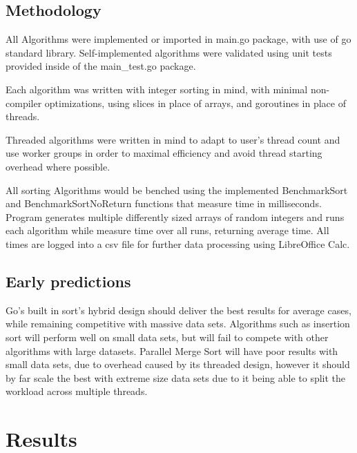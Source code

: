 \documentclass[11pt,a4paper]{article}
\begin{document}
\subsection{Methodology}

All Algorithms were implemented or imported in main.go package, with use of go standard library.
Self-implemented algorithms were validated using unit tests provided inside of
the main\_test.go package.

Each algorithm was written with integer sorting in mind, with minimal
non-compiler optimizations, using slices in place of arrays, and goroutines in
place of threads.

Threaded algorithms were written in mind to adapt to user's thread count and
use worker groups in order to maximal efficiency and avoid thread starting
overhead where possible.

All sorting Algorithms would be benched using the implemented BenchmarkSort and
BenchmarkSortNoReturn functions that measure time in milliseconds. Program
generates multiple differently sized arrays of random integers and runs each
algorithm while measure time over all runs, returning average time. All times
are logged into a csv file for further data processing using LibreOffice Calc.

\subsection{Early predictions}
Go's built in sort's hybrid design should deliver the best results for average
cases, while remaining competitive with massive data sets. Algorithms such as
insertion sort will perform well on small data sets, but will fail to compete
with other algorithms  with large datasets. Parallel Merge Sort will have poor
results with small data sets, due to overhead caused by its threaded design,
however it should by far scale the best with extreme size data sets due to it
being able to split the workload across multiple threads.

\newpage
\section{Results}
\end{document}
